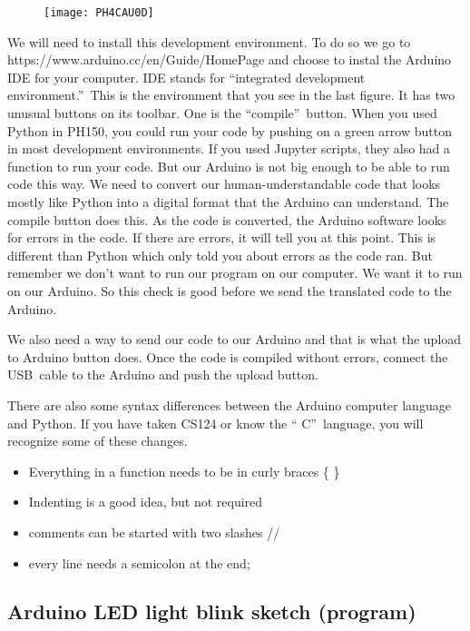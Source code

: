 \begin{figure}[h!]
	\centering
	\texttt{[image: PH4CAU0D]}
\end{figure}

We will need to install this
development environment. To do so we go to
https://www.arduino.cc/en/Guide/HomePage and choose to instal the Arduino
IDE for your computer. IDE stands for \textquotedblleft integrated
development environment.\textquotedblright\ This is the environment that you
see in the last figure. It has two unusual buttons on its toolbar. One is
the \textquotedblleft compile\textquotedblright\ button. When you used
Python in PH150, you could run your code by pushing on a green arrow button
in most development environments. If you used Jupyter scripts, they also had
a function to run your code. But our Arduino is not big enough to be able to
run code this way. We need to convert our human-understandable code that
looks mostly like Python into a digital format that the Arduino can
understand. The compile button does this. As the code is converted, the
Arduino software looks for errors in the code. If there are errors, it will
tell you at this point. This is different than Python which only told you
about errors as the code ran. But remember we don't want to run our program
on our computer. We want it to run on our Arduino. So this check is good
before we send the translated code to the Arduino.

We also need a way to send our code to our Arduino and that is what the
upload to Arduino button does. Once the code is compiled without errors,
connect the USB\ cable to the Arduino and push the upload button.

There are also some syntax differences between the Arduino computer language
and Python. If you have taken CS124 or know the \textquotedblleft
C\textquotedblright\ language, you will recognize some of these changes.

\begin{itemize}
	\item Everything in a function needs to be in curly braces \{ \}
	\item Indenting is a good idea, but not required
	\item comments can be started with two slashes //
	\item every line needs a semicolon at the end;
\end{itemize}

\subsection{Arduino LED light blink sketch (program)}

